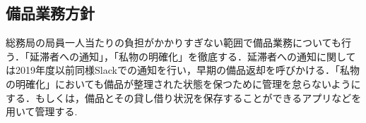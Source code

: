 \subsection*{備品業務方針}


総務局の局員一人当たりの負担がかかりすぎない範囲で備品業務についても行う．「延滞者への通知」，「私物の明確化」を徹底する．延滞者への通知に関しては2019年度以前同様Slackでの通知を行い，早期の備品返却を呼びかける．「私物の明確化」においても備品が整理された状態を保つために管理を怠らないようにする．もしくは，備品とその貸し借り状況を保存することができるアプリなどを用いて管理する.
